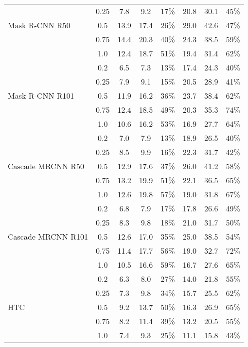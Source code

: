 \begin{table*}[]
\begin{tabular}{lccccccc}
                   & 0.25 & 7.8  & 9.2  & 17\% & 20.8 & 30.1 & 45\% \\
Mask R-CNN R50     & 0.5  & 13.9 & 17.4 & 26\% & 29.0 & 42.6 & 47\% \\
                   & 0.75 & 14.4 & 20.3 & 40\% & 24.3 & 38.5 & 59\% \\
                   & 1.0  & 12.4 & 18.7 & 51\% & 19.4 & 31.4 & 62\% \\
\midrule
                   & 0.2  & 6.5  & 7.3  & 13\% & 17.4 & 24.3 & 40\% \\
                   & 0.25 & 7.9  & 9.1  & 15\% & 20.5 & 28.9 & 41\% \\
Mask R-CNN R101    & 0.5  & 11.9 & 16.2 & 36\% & 23.7 & 38.4 & 62\% \\
                   & 0.75 & 12.4 & 18.5 & 49\% & 20.3 & 35.3 & 74\% \\
                   & 1.0  & 10.6 & 16.2 & 53\% & 16.9 & 27.7 & 64\% \\
\midrule
                   & 0.2  & 7.0  & 7.9  & 13\% & 18.9 & 26.5 & 40\% \\
                   & 0.25 & 8.5  & 9.9  & 16\% & 22.3 & 31.7 & 42\% \\
Cascade MRCNN R50  & 0.5  & 12.9 & 17.6 & 37\% & 26.0 & 41.2 & 58\% \\
                   & 0.75 & 13.2 & 19.9 & 51\% & 22.1 & 36.5 & 65\% \\
                   & 1.0  & 12.6 & 19.8 & 57\% & 19.0 & 31.8 & 67\% \\
\midrule
                   & 0.2  & 6.8  & 7.9  & 17\% & 17.8 & 26.6 & 49\% \\
                   & 0.25 & 8.3  & 9.8  & 18\% & 21.0 & 31.7 & 50\% \\
Cascade MRCNN R101 & 0.5  & 12.6 & 17.0 & 35\% & 25.0 & 38.5 & 54\% \\
                   & 0.75 & 11.4 & 17.7 & 56\% & 19.0 & 32.7 & 72\% \\
                   & 1.0  & 10.5 & 16.6 & 59\% & 16.7 & 27.6 & 65\% \\
\midrule
                   & 0.2  & 6.3  & 8.0  & 27\% & 14.0 & 21.8 & 55\% \\
                   & 0.25 & 7.3  & 9.8  & 34\% & 15.7 & 25.5 & 62\% \\
HTC                & 0.5  & 9.2  & 13.7 & 50\% & 16.3 & 26.9 & 65\% \\
                   & 0.75 & 8.2  & 11.4 & 39\% & 13.2 & 20.5 & 55\% \\
                   & 1.0  & 7.4  & 9.3  & 25\% & 11.1 & 15.8 & 43\% \\
\bottomrule
\end{tabular}
\addtolength{\tabcolsep}{-0.2em}
\end{table*}

